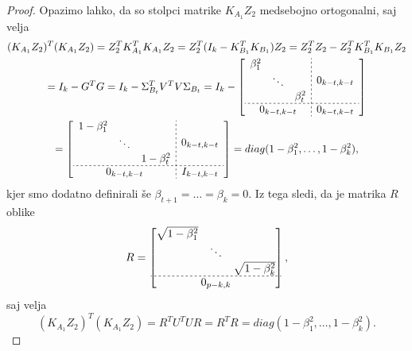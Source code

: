 \documentclass[mat1]{article}
\begin{document}
\begin{proof}
Opazimo lahko, da so stolpci matrike $K_{A_1} Z_2$ medsebojno ortogonalni, saj velja
\begin{gather*}
(K_{A_1} Z_2)^T (K_{A_1} Z_2) = Z_2^T K_{A_1}^T K_{A_1} Z_2 %
= Z_2^T (I_{k} - K_{B_1}^T K_{B_1}) Z_2 = Z_2^T Z_2 -  Z_2^T K_{B_1}^T K_{B_1} Z_2 \\
= I_k - G^T G = I_k - \Sigma_{B_t}^T V^T V \Sigma_{B_t} %
= I_k - 
\left[
\begin{array}{c;{2pt/2pt}c}
\begin{matrix}
\beta_1^2 & & \\
 & \ddots & \\
 & & \beta_t^2
\end{matrix} & 0_{k - t,k - t}
 \\ \hdashline[2pt/2pt]
0_{k - t, k - t} & 0_{k - t, k - t}
\end{array} \right] \\
= 
\left[
\begin{array}{c;{2pt/2pt}c}
\begin{matrix}
1 - \beta_1^2 & & \\
 & \ddots & \\
 & & 1 - \beta_t^2
\end{matrix} & 0_{k - t,k - t}
 \\ \hdashline[2pt/2pt]
0_{k - t, k - t} & I_{k - t, k - t}
\end{array} \right]  = diag(1-\beta_1^2, \ldots, 1-\beta_k^2) \text{,}
\end{gather*}
kjer smo dodatno definirali še $\beta_{t+1} = \ldots = \beta_{k} = 0$. 
Iz tega sledi, da je matrika $R$ oblike 
$$ R = 
\begin{bmatrix}
\begin{matrix}
\sqrt{1 - \beta_1^2} & & \\
 & \ddots & \\
 & & \sqrt{1 - \beta_k^2}
\end{matrix} \\ \hdashline[2pt/2pt]
0_{p-k, k}
\end{bmatrix} \text{,}
$$ saj velja 
$$
(K_{A_1} Z_2)^T (K_{A_1} Z_2) = R^T U^T U R = R^T R = diag(1-\beta_1^2, \ldots, 1-\beta_k^2) \text{.}
$$


\end{proof}
\end{document}

